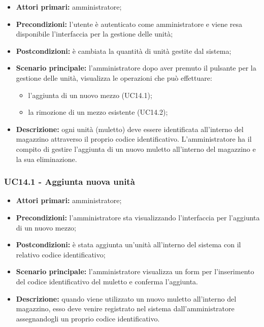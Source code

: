 \begin{itemize}
	\item 	\textbf{Attori primari:} amministratore;
	\item 	\textbf{Precondizioni:} l'utente è autenticato come amministratore e viene resa disponibile l'interfaccia per la gestione delle unità;
	\item 	\textbf{Postcondizioni:} è cambiata la quantità di unità gestite dal sistema;
	\item 	\textbf{Scenario principale:} l'amministratore dopo aver premuto il pulsante per la gestione delle unità, visualizza le operazioni che può effettuare:
	\begin{itemize}
		\item l'aggiunta di un nuovo mezzo (UC14.1);
		\item la rimozione di un mezzo esistente (UC14.2);
	\end{itemize}
	\item 	\textbf{Descrizione:} ogni unità (muletto) deve essere identificata all'interno del magazzino attraverso il proprio codice identificativo. L'amministratore ha il compito di gestire l'aggiunta di un nuovo muletto all'interno del magazzino e la sua eliminazione.
\end{itemize}

\subsubsection{UC14.1 - Aggiunta nuova unità}
\begin{itemize}
	\item 	\textbf{Attori primari:} amministratore;
	\item 	\textbf{Precondizioni:} l'amministratore sta visualizzando l'interfaccia per l'aggiunta di un nuovo mezzo;
	\item 	\textbf{Postcondizioni:} è stata aggiunta un'unità all'interno del sistema con il relativo codice identificativo;
	\item 	\textbf{Scenario principale:} l'amministratore visualizza un form per l'inserimento del codice identificativo del muletto e conferma l'aggiunta.
	\item 	\textbf{Descrizione:} quando viene utilizzato un nuovo muletto all'interno del magazzino, esso deve venire registrato nel sistema dall'amministratore assegnandogli un proprio codice identificativo.

\end{itemize}


